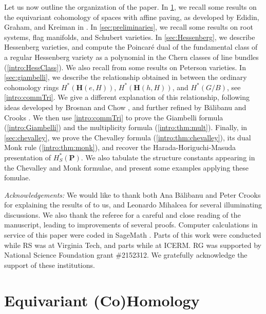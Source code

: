 \documentclass[10pt]{article}
\numberwithin{thm}{section}
\theoremstyle{definition}
\theoremstyle{remark}
\newcommand{\Pet}{\ensuremath{\mathbf{P}}}
\newcommand{\Hess}{\mathbf H}
\begin{document}
Let us now outline the organization of the paper.
In \cref{sec:cohomology}, we recall some results on the equivariant cohomology of spaces with affine paving,
as developed by Edidin, Graham, and Kreiman in \cite{edidin.graham,graham:positivity,graham2020cominuscule}.
In \cref{sec:preliminaries},
we recall some results on root systems, flag manifolds, and Schubert varieties.
In \cref{sec:Hessenberg}, we describe Hessenberg varieties,
and compute the Poincar\'e dual of the fundamental class of a regular Hessenberg variety as a polynomial in the Chern classes of line bundles
(\cref{intro:HessClass}).
We also recall from \cite{tymoczko:paving,precup,gms:peterson} some results on Peterson varieties.
In \cref{sec:giambelli}, we describe the relationship obtained in \cite{MR4116638}
between the ordinary cohomology rings
$H^*(\Hess(e,H))$, $H^*(\Hess(h,H))$, and $H^*(G/B)$,
see \cref{intro:commTri}.
We give a different explanation of this relationship,
following ideas developed by Brosnan and Chow \cite{brosnan-chow},
and further refined by B{\u{a}}libanu and Crooks \cite{balibanu2020perverse}.
We then use \cref{intro:commTri} to prove the Giambelli formula (\cref{intro:Giambelli})
and the multiplicity formula (\cref{intro:thm:mult}).
Finally, in \cref{sec:chevalley},
we prove the Chevalley formula (\cref{intro:thm:chevalley}),
its dual Monk rule (\cref{intro:thm:monk}),
and recover the Harada-Horiguchi-Masuda presentation of $H^*_S(\Pet)$.
We also tabulate the structure constants appearing in the Chevalley and Monk formulae,
and present some examples applying these fomulae.

\emph{Acknowledgements:}
We would like to thank both Ana B\u alibanu and Peter Crooks for explaining the results of \cite{balibanu2020perverse} to us, and 
Leonardo Mihalcea for several illuminating discussions. We also thank the referee for a careful and close reading of the manuscript, leading to improvements of several proofs.
Computer calculations in service of this paper were coded in SageMath \cite{sagemath}. 
Parts of this work were conducted while RS was at Virginia Tech,
and parts while at ICERM. RG was supported by National Science Foundation grant \#2152312.
We gratefully acknowledge the support of these institutions.


\section{Equivariant (Co)Homology}
\label{sec:cohomology}
\end{document}
